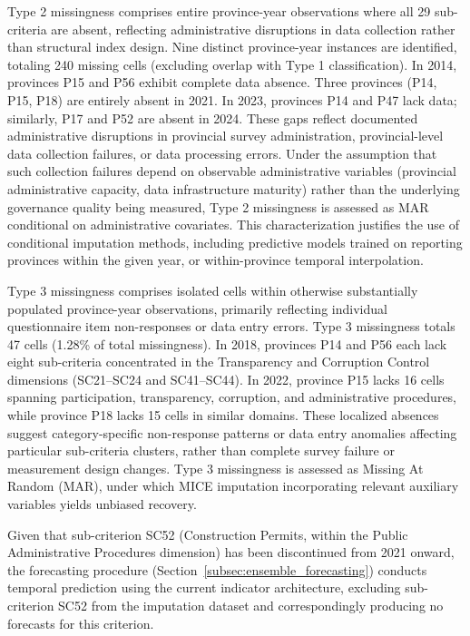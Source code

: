 \documentclass[12pt,a4paper]{article}
\begin{document}
Type 2 missingness comprises entire province-year observations where all 29 sub-criteria are absent, reflecting administrative disruptions in data collection rather than structural index design. Nine distinct province-year instances are identified, totaling 240 missing cells (excluding overlap with Type 1 classification). In 2014, provinces P15 and P56 exhibit complete data absence. Three provinces (P14, P15, P18) are entirely absent in 2021. In 2023, provinces P14 and P47 lack data; similarly, P17 and P52 are absent in 2024. These gaps reflect documented administrative disruptions in provincial survey administration, provincial-level data collection failures, or data processing errors. Under the assumption that such collection failures depend on observable administrative variables (provincial administrative capacity, data infrastructure maturity) rather than the underlying governance quality being measured, Type 2 missingness is assessed as MAR conditional on administrative covariates. This characterization justifies the use of conditional imputation methods, including predictive models trained on reporting provinces within the given year, or within-province temporal interpolation.

Type 3 missingness comprises isolated cells within otherwise substantially populated province-year observations, primarily reflecting individual questionnaire item non-responses or data entry errors. Type 3 missingness totals 47 cells (1.28\% of total missingness). In 2018, provinces P14 and P56 each lack eight sub-criteria concentrated in the Transparency and Corruption Control dimensions (SC21--SC24 and SC41--SC44). In 2022, province P15 lacks 16 cells spanning participation, transparency, corruption, and administrative procedures, while province P18 lacks 15 cells in similar domains. These localized absences suggest category-specific non-response patterns or data entry anomalies affecting particular sub-criteria clusters, rather than complete survey failure or measurement design changes. Type 3 missingness is assessed as Missing At Random (MAR), under which MICE imputation incorporating relevant auxiliary variables yields unbiased recovery.

Given that sub-criterion SC52 (Construction Permits, within the Public Administrative Procedures dimension) has been discontinued from 2021 onward, the forecasting procedure (Section~\ref{subsec:ensemble_forecasting}) conducts temporal prediction using the current indicator architecture, excluding sub-criterion SC52 from the imputation dataset and correspondingly producing no forecasts for this criterion.
\end{document}
